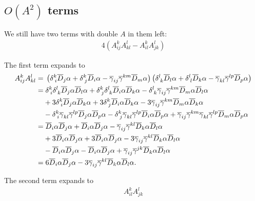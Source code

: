 \documentclass[aps,prd,preprint]{revtex4-1}
\newcommand{\ogamma}{\overline{\gamma}}
\newcommand{\OD}{\overline{D}}
\begin{document}
\subsection{\texorpdfstring{$O(A^2)$}{Double-A}  terms}

We still have two terms with double $A$ in them left:
\begin{align}\label{eq:double-A}
4 \left( A^k_{ij} A^l_{kl} - A^k_{il} A^l_{jk} \right)
\end{align}

The first term expands to
\begin{align}
A^k_{ij} A^l_{kl} = & \;
  \left( \delta^k_{\; i} \OD_j \alpha + \delta^k_{\; j} \OD_i \alpha - \ogamma_{ij} \ogamma^{km} \OD_m \alpha \right)
  \left( \delta^l_{\; k} \OD_l \alpha + \delta^l_{\; l} \OD_k \alpha - \ogamma_{kl} \ogamma^{lp} \OD_p \alpha \right) \\
= & \; \delta^k_{\; i} \delta^l_{\; k} \OD_j \alpha \OD_l \alpha + \delta^k_{\; j} \delta^l_{\; k} \OD_i \alpha  \OD_k \alpha -
  \delta^l_{\; k} \ogamma_{ij} \ogamma^{km} \OD_m \alpha \OD_l \alpha \notag \\
& + 3 \delta^k_{\; i} \OD_j \alpha \OD_k \alpha +3 \delta^k_{\; j} \OD_i \alpha \OD_k \alpha -
  3 \ogamma_{ij} \ogamma^{km} \OD_m \alpha \OD_k \alpha \notag \\
& - \delta^k_{\; i} \ogamma_{kl} \ogamma^{lp} \OD_j \alpha \OD_p \alpha -
  \delta^k_{\; j} \ogamma_{kl} \ogamma^{lp} \OD_i \alpha \OD_p \alpha +
  \ogamma_{ij} \ogamma^{km} \ogamma_{kl} \ogamma^{lp} \OD_m \alpha \OD_p \alpha \\
= & \; \OD_i \alpha \OD_j \alpha + \OD_i \alpha \OD_j \alpha - \ogamma_{ij} \ogamma^{kl} \OD_k \alpha \OD_l \alpha
  \notag \\
& + 3 \OD_i \alpha \OD_j \alpha + 3 \OD_i \alpha \OD_j \alpha - 3 \ogamma_{ij} \ogamma^{kl} \OD_k \alpha \OD_l \alpha
  \notag \\
& - \OD_i \alpha \OD_j \alpha - \OD_i \alpha \OD_j \alpha + \ogamma_{ij} \ogamma^{jk} \OD_k \alpha \OD_l \alpha \\
= & \; 6 \OD_i \alpha \OD_j \alpha - 3 \ogamma_{ij} \ogamma^{kl} \OD_k \alpha \OD_l \alpha. \label{eq:double-A-first}
\end{align}

The second term expands to
\begin{align}
A^k_{il} A^l_{jk}
\end{align}
\end{document}
